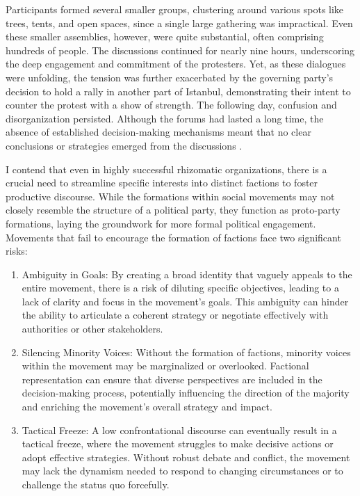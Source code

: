Participants formed several smaller groups, clustering around various spots like trees, tents, and open spaces, since a single large gathering was impractical. Even these smaller assemblies, however, were quite substantial, often comprising hundreds of people. The discussions continued for nearly nine hours, underscoring the deep engagement and commitment of the protesters. Yet, as these dialogues were unfolding, the tension was further exacerbated by the governing party’s decision to hold a rally in another part of Istanbul, demonstrating their intent to counter the protest with a show of strength. The following day, confusion and disorganization persisted. Although the forums had lasted a long time, the absence of established decision-making mechanisms meant that no clear conclusions or strategies emerged from the discussions \parencite[73]{tufekci2020}.

I contend that even in highly successful rhizomatic organizations, there is a crucial need to streamline specific interests into distinct factions to foster productive discourse. While the formations within social movements may not closely resemble the structure of a political party, they function as proto-party formations, laying the groundwork for more formal political engagement. Movements that fail to encourage the formation of factions face two significant risks:

\begin{enumerate} \item Ambiguity in Goals: By creating a broad identity that vaguely appeals to the entire movement, there is a risk of diluting specific objectives, leading to a lack of clarity and focus in the movement’s goals. This ambiguity can hinder the ability to articulate a coherent strategy or negotiate effectively with authorities or other stakeholders.

\item Silencing Minority Voices: Without the formation of factions, minority voices within the movement may be marginalized or overlooked. Factional representation can ensure that diverse perspectives are included in the decision-making process, potentially influencing the direction of the majority and enriching the movement's overall strategy and impact.

\item Tactical Freeze: A low confrontational discourse can eventually result in a tactical freeze, where the movement struggles to make decisive actions or adopt effective strategies. Without robust debate and conflict, the movement may lack the dynamism needed to respond to changing circumstances or to challenge the status quo forcefully. \end{enumerate}

